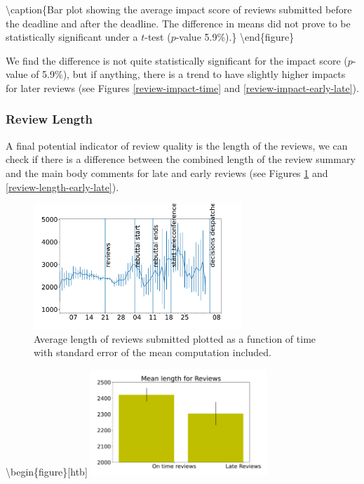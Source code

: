 \textbackslash caption\{Bar plot showing the average impact score of
reviews submitted before the deadline and after the deadline. The
difference in means did not prove to be statistically significant under
a \(t\)-test (\(p\)-value 5.9\%).\} \label{review-impact-early-late}
\textbackslash end\{figure\}

We find the difference is not quite statistically significant for the
impact score (\(p\)-value of 5.9\%), but if anything, there is a trend
to have slightly higher impacts for later reviews (see Figures
\ref{review-impact-time} and \ref{review-impact-early-late}).

\hypertarget{review-length}{%
\subsubsection{Review Length}\label{review-length}}

A final potential indicator of review quality is the length of the
reviews, we can check if there is a difference between the combined
length of the review summary and the main body comments for late and
early reviews (see Figures \ref{review-length-time} and
\ref{review-length-early-late}).

\begin{figure}[htb]
\includegraphics[width=0.70\textwidth]{diagrams/neurips/review-length-time.pdf}


\caption{Average length of reviews submitted plotted as a function of time with standard error of the mean computation included.}
\label{review-length-time}
\end{figure}

\textbackslash begin\{figure\}{[}htb{]}
\includegraphics[width=0.50\textwidth]{diagrams/neurips/review-length-early-late.pdf}

